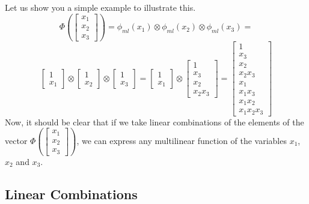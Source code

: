 \documentclass{article}
\theoremstyle{definition}
\theoremstyle{definition}
\begin{document}
Let us show you a simple example to illustrate this.
\[
    \Phi(\begin{bmatrix}x_1 \\ x_2 \\ x_3 \end{bmatrix})
    =
    \phi_{ml}(x_1) \otimes \phi_{ml}(x_2) \otimes \phi_{ml}(x_3)
    =
\]
\[
\begin{bmatrix}
    1 \\ x_1
\end{bmatrix}
\otimes
\begin{bmatrix}
    1 \\ x_2
\end{bmatrix}
\otimes
\begin{bmatrix}
    1 \\ x_3
\end{bmatrix}
=
\begin{bmatrix}
    1 \\ x_1
\end{bmatrix}
\otimes
\begin{bmatrix}
    1 \\ x_3 \\ x_2 \\ x_2 x_3
\end{bmatrix}
=
\begin{bmatrix}
    1 \\ x_3 \\ x_2 \\ x_2 x_3 \\ x_1 \\ x_1 x_3 \\ x_1 x_2 \\ x_1 x_2 x_3
\end{bmatrix}
\]
Now, it should be clear that if we take linear combinations of the elements of the vector $\Phi(\begin{bmatrix}x_1 \\ x_2 \\ x_3 \end{bmatrix})$, we can express any multilinear function of the variables $x_1$, $x_2$ and $x_3$.
\subsection{Linear Combinations}
\end{document}
